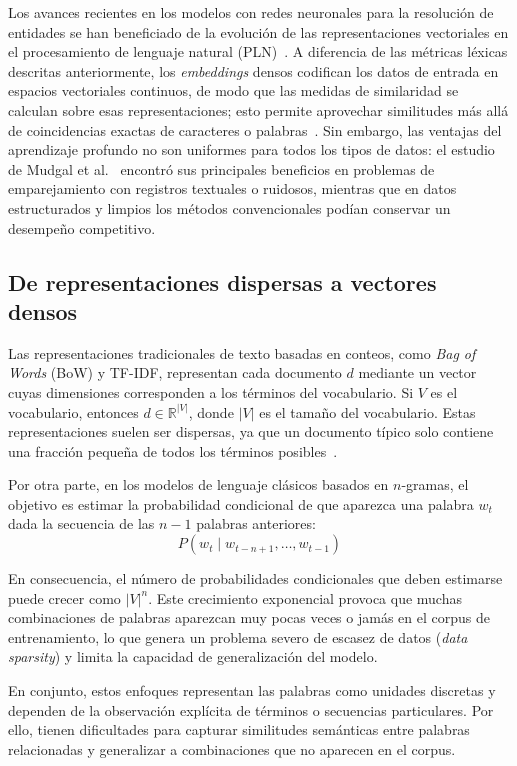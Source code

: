 Los avances recientes en los modelos con redes neuronales para la resolución de entidades se han beneficiado de la evolución de las representaciones vectoriales en el procesamiento de lenguaje natural (PLN)~\cite{barlaug2021}. A diferencia de las métricas léxicas descritas anteriormente, los \textit{embeddings} densos codifican los datos de entrada en espacios vectoriales continuos, de modo que las medidas de similaridad se calculan sobre esas representaciones; esto permite aprovechar similitudes más allá de coincidencias exactas de caracteres o palabras~\cite{li2020}. Sin embargo, las ventajas del aprendizaje profundo no son uniformes para todos los tipos de datos: el estudio de Mudgal et al.~\cite{mudgal2018} encontró sus principales beneficios en problemas de emparejamiento con registros textuales o ruidosos, mientras que en datos estructurados y limpios los métodos convencionales podían conservar un desempeño competitivo.

\subsection{De representaciones dispersas a vectores densos}

Las representaciones tradicionales de texto basadas en conteos, como \textit{Bag of Words} (BoW) y TF-IDF, representan cada documento $d$ mediante un vector cuyas dimensiones corresponden a los términos del vocabulario. Si $V$ es el vocabulario, entonces $d \in \mathbb{R}^{\lvert V\rvert}$, donde $\lvert V\rvert$ es el tamaño del vocabulario. Estas representaciones suelen ser dispersas, ya que un documento típico solo contiene una fracción pequeña de todos los términos posibles~\cite{salton1988}.

Por otra parte, en los modelos de lenguaje clásicos basados en $n$-gramas, el objetivo es estimar la probabilidad condicional de que aparezca una palabra $w_t$ dada la secuencia de las $n-1$ palabras anteriores:
\[
P(w_t \mid w_{t-n+1}, \ldots, w_{t-1})
\]

En consecuencia, el número de probabilidades condicionales que deben estimarse puede crecer como $\lvert V\rvert^n$. Este crecimiento exponencial provoca que muchas combinaciones de palabras aparezcan muy pocas veces o jamás en el corpus de entrenamiento, lo que genera un problema severo de escasez de datos (\textit{data sparsity}) y limita la capacidad de generalización del modelo.

En conjunto, estos enfoques representan las palabras como unidades discretas y dependen de la observación explícita de términos o secuencias particulares. Por ello, tienen dificultades para capturar similitudes semánticas entre palabras relacionadas y generalizar a combinaciones que no aparecen en el corpus.

